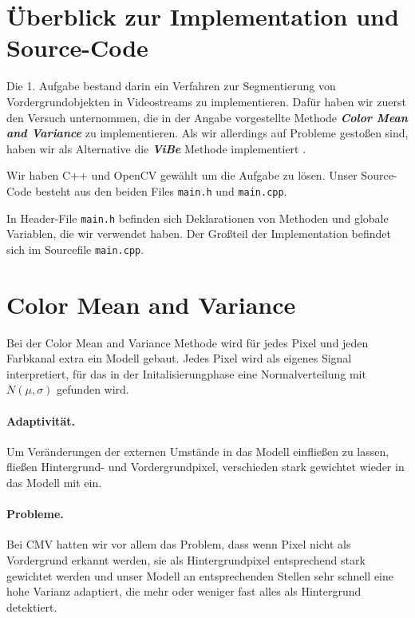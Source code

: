 \documentclass[]{scrartcl}
\begin{document}
\maketitle

\section{\"Uberblick zur Implementation und Source-Code}
Die 1. Aufgabe bestand darin ein Verfahren zur Segmentierung von Vordergrundobjekten in Videostreams zu implementieren. Daf\"ur haben wir zuerst den Versuch unternommen, die in der Angabe vorgestellte Methode \textbf{\textit{Color Mean and Variance}} zu implementieren. Als wir allerdings auf Probleme gesto\ss{}en sind, haben wir als Alternative die \textbf{\textit{ViBe}} Methode implementiert \cite{barnich2011vibe}.

Wir haben C++ und OpenCV gew\"ahlt um die Aufgabe zu l\"osen. Unser Source-Code besteht aus den beiden Files \texttt{main.h} und \texttt{main.cpp}.

In Header-File \texttt{main.h} befinden sich Deklarationen von Methoden und globale Variablen, die wir verwendet haben. Der Gro\ss{}teil der Implementation befindet sich im Sourcefile \texttt{main.cpp}. 



\section{Color Mean and Variance}\label{sec:cmv}
Bei der Color Mean and Variance Methode wird f\"ur jedes Pixel und jeden Farbkanal extra ein Modell gebaut. Jedes Pixel wird als eigenes Signal interpretiert, f\"ur das in der Initalisierungphase eine Normalverteilung mit $N(\mu, \sigma)$ gefunden wird. 

\paragraph{Adaptivit\"at.} 
Um Ver\"anderungen der externen Umst\"ande in das Modell einflie\ss{}en zu lassen, flie\ss{}en Hintergrund- und Vordergrundpixel, verschieden stark gewichtet wieder in das Modell mit ein.

\paragraph{Probleme.} 
Bei CMV hatten wir vor allem das Problem, dass wenn Pixel nicht als Vordergrund erkannt werden, sie als Hintergrundpixel entsprechend stark gewichtet werden und unser Modell an entsprechenden Stellen sehr schnell eine hohe Varianz adaptiert, die mehr oder weniger fast alles als Hintergrund detektiert.
\end{document}
